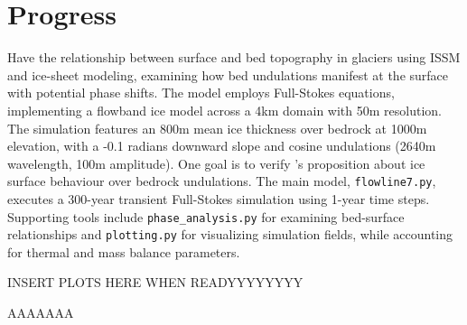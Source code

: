 \chapter{Progress}

Have the relationship between surface and bed topography in glaciers using ISSM and ice-sheet modeling, examining how bed undulations manifest at the surface with potential phase shifts. The model employs Full-Stokes equations, implementing a flowband ice model across a 4km domain with 50m resolution. The simulation features an 800m mean ice thickness over bedrock at 1000m elevation, with a -0.1 radians downward slope and cosine undulations (2640m wavelength, 100m amplitude). One goal is to verify \cite{Budd_1970}'s proposition about ice surface behaviour over bedrock undulations. The main model, \texttt{flowline7.py}, executes a 300-year transient Full-Stokes simulation using 1-year time steps. Supporting tools include \texttt{phase\_analysis.py} for examining bed-surface relationships and \texttt{plotting.py} for visualizing simulation fields, while accounting for thermal and mass balance parameters.

\vspace{6cm}
INSERT PLOTS HERE WHEN READYYYYYYYY

AAAAAAA